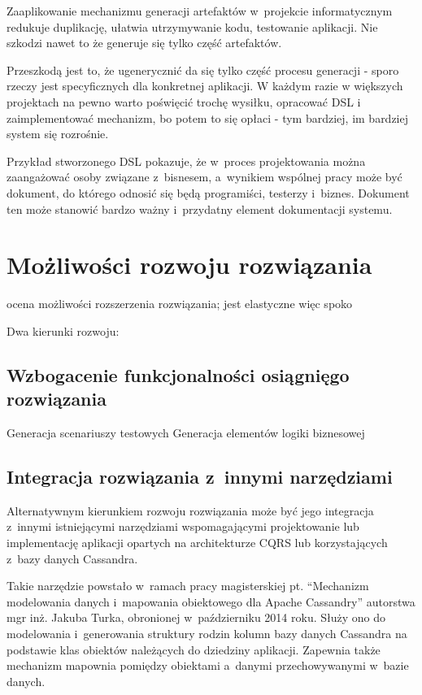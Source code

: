 Zaaplikowanie mechanizmu generacji artefaktów w~projekcie informatycznym redukuje duplikację, ułatwia utrzymywanie kodu, testowanie aplikacji.
Nie szkodzi nawet to że generuje się tylko część artefaktów.

Przeszkodą jest to, że ugenerycznić da się tylko część procesu generacji - sporo rzeczy jest specyficznych dla konkretnej aplikacji.
W każdym razie w większych projektach na pewno warto poświęcić trochę wysiłku, opracować DSL i zaimplementować mechanizm, bo potem to się opłaci - tym bardziej, im bardziej system się rozrośnie.

Przykład stworzonego DSL pokazuje, że w~proces projektowania można zaangażować osoby związane z~bisnesem, a~wynikiem wspólnej pracy może być dokument, do którego odnosić się będą programiści, testerzy i~biznes.
Dokument ten może stanowić bardzo ważny i~przydatny element dokumentacji systemu.



\section{Możliwości rozwoju rozwiązania}

ocena możliwości rozszerzenia rozwiązania; jest elastyczne więc spoko

Dwa kierunki rozwoju:


\subsection{Wzbogacenie funkcjonalności osiągnięgo rozwiązania}

Generacja scenariuszy testowych
Generacja elementów logiki biznesowej


\subsection{Integracja rozwiązania z~innymi narzędziami}

Alternatywnym kierunkiem rozwoju rozwiązania może być jego integracja z~innymi istniejącymi narzędziami wspomagającymi projektowanie lub implementację aplikacji opartych na architekturze CQRS lub korzystających z~bazy danych Cassandra.

Takie narzędzie powstało w~ramach pracy magisterskiej pt. ``Mechanizm modelowania danych i~mapowania obiektowego dla Apache Cassandry'' autorstwa mgr inż. Jakuba Turka, obronionej w~październiku 2014 roku.
Służy ono do modelowania i~generowania struktury rodzin kolumn bazy danych Cassandra na podstawie klas obiektów należących do dziedziny aplikacji.
Zapewnia także mechanizm mapownia pomiędzy obiektami a~danymi przechowywanymi w~bazie danych.

